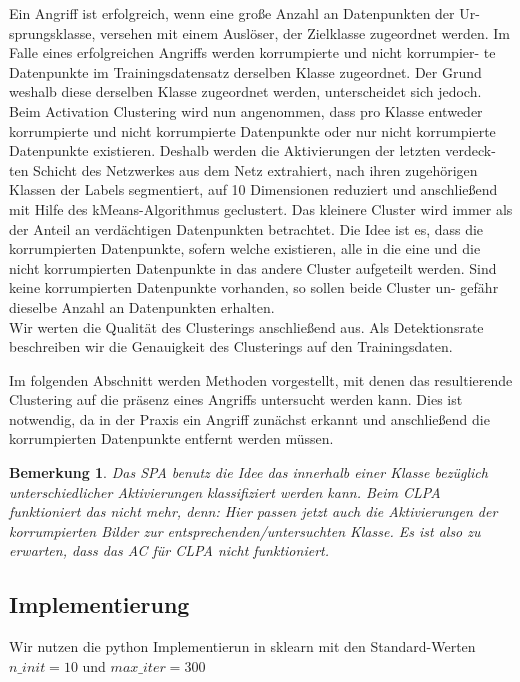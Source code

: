 \documentclass[11pt,a4paper]{article}
\newtheorem{remark}[theorem]{Bemerkung}
\numberwithin{equation}{section}
\begin{document}
		Ein Angriff ist erfolgreich, wenn eine große Anzahl an Datenpunkten der Ur-
		sprungsklasse, versehen mit einem Auslöser, der Zielklasse zugeordnet werden.
		Im Falle eines erfolgreichen Angriffs werden korrumpierte und nicht korrumpier-
		te Datenpunkte im Trainingsdatensatz derselben Klasse zugeordnet. Der Grund
		weshalb diese derselben Klasse zugeordnet werden, unterscheidet sich jedoch.
		Beim Activation Clustering wird nun angenommen, dass pro Klasse entweder
		korrumpierte und nicht korrumpierte Datenpunkte oder nur nicht korrumpierte
		Datenpunkte existieren. Deshalb werden die Aktivierungen der letzten verdeck-
		ten Schicht des Netzwerkes aus dem Netz extrahiert, nach ihren zugehörigen
		Klassen der Labels segmentiert, auf 10 Dimensionen reduziert und anschließend
		mit Hilfe des kMeans-Algorithmus geclustert. Das kleinere Cluster wird immer
		als der Anteil an verdächtigen Datenpunkten betrachtet. Die Idee ist es, dass
		die korrumpierten Datenpunkte, sofern welche existieren, alle in die eine und
		die nicht korrumpierten Datenpunkte in das andere Cluster aufgeteilt werden.
		Sind keine korrumpierten Datenpunkte vorhanden, so sollen beide Cluster un-
		gefähr dieselbe Anzahl an Datenpunkten erhalten.\\
		
		Wir werten die Qualität des Clusterings anschließend aus. Als Detektionsrate
		beschreiben wir die Genauigkeit des Clusterings auf den Trainingsdaten.
		
		Im folgenden Abschnitt werden Methoden vorgestellt, mit denen das resultierende Clustering auf die präsenz eines Angriffs untersucht werden kann. Dies ist notwendig, da in der Praxis ein Angriff zunächst erkannt und anschließend die korrumpierten Datenpunkte entfernt werden müssen. 
		
		\begin{remark}
			Das SPA benutz die Idee das innerhalb einer Klasse bezüglich unterschiedlicher Aktivierungen klassifiziert werden kann. Beim CLPA funktioniert das nicht mehr, denn: Hier passen jetzt auch die Aktivierungen der korrumpierten Bilder zur entsprechenden/untersuchten Klasse. Es ist also zu erwarten, dass das AC für CLPA nicht funktioniert.
		\end{remark}
	
		\subsection{Implementierung}
		Wir nutzen die python Implementierun in sklearn mit den Standard-Werten $n\_init=10$ und $max\_iter=300$
		
\end{document}
